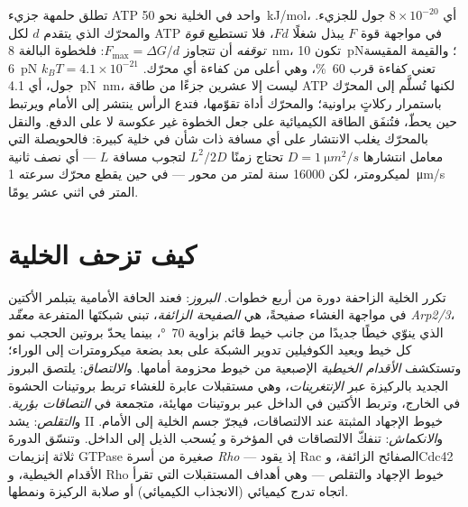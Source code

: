 \begin{proposition}\label{prop:b3:cytoskeleton-motility:physics}
تطلق حلمهة جزيء ATP واحد في الخلية نحو \qty{50}{kJ/mol}،
أي $8\times 10^{-20}$ جول للجزيء. والمحرّك الذي يتقدم $d$
لكل ATP في مواجهة قوة $F$ يبذل شغلًا $Fd$، فلا تستطيع \emph{قوة توقفه}
أن تتجاوز $F_{\max} = \Delta G/d$: فلخطوة  البالغة \qty{8}{nm}،
تكون \qty{10}{pN}؛ والقيمة المقيسة \qty{6}{pN} تعني كفاءة قرب
\qty{60}{\%}، وهي أعلى من كفاءة أي محرّك.  $k_{B}T =
4.1\times 10^{-21}$ جول، أي \qty{4.1}{pN.nm}، ليست إلا عشرين جزءًا من
طاقة ATP لكنها تُسلَّم إلى المحرّك باستمرار ركلاتٍ
براونية؛ والمحرّك أداة تقوّمها، فتدع الرأس
ينتشر إلى الأمام ويرتبط حين يحطّ، فتُنفَق الطاقة الكيميائية
على جعل الخطوة غير عكوسة لا على الدفع.
والنقل بالمحرّك يغلب الانتشار على أي مسافة ذات شأن في
خلية كبيرة: فالحويصلة التي معامل انتشارها $D = \qty{1}{\micro
m^2/s}$ تحتاج زمنًا $L^{2}/2D$ لتجوب مسافة $L$ --- أي نصف
ثانية لميكرومتر، لكن \num{16000} سنة لمتر من محور ---
في حين يقطع محرّك سرعته \qty{1}{\micro m/s} المتر في اثني عشر يومًا.
\end{proposition}
\admitted

\section{كيف تزحف الخلية}

\begin{definition}\label{def:b3:cytoskeleton-motility:migration}
تكرر الخلية الزاحفة دورة من أربع خطوات. \emph{البروز}: فعند
الحافة الأمامية يتبلمر الأكتين في مواجهة الغشاء صفيحةً، هي
\emph{الصفيحة الزائفة}، تبني شبكتَها المتفرعة
\emph{معقّد Arp2/3}، الذي ينوّي خيطًا جديدًا من جانب
خيط قائم بزاوية \qty{70}{\degree}، بينما يحدّ بروتين الحجب نمو كل
خيط ويعيد الكوفيلين تدوير الشبكة على بعد بضعة ميكرومترات
إلى الوراء؛ وتستكشف \emph{الأقدام الخيطية} الإصبعية من خيوط محزومة أمامها.
و\emph{الالتصاق}: يلتصق البروز الجديد بالركيزة عبر
\emph{الإنتغرينات}، وهي مستقبلات عابرة للغشاء تربط بروتينات الحشوة
في الخارج، وتربط الأكتين في الداخل عبر بروتينات مهايئة، متجمعة في
\emph{التصاقات بؤرية}. و\emph{التقلص}: يشد  II
خيوط الإجهاد المثبتة عند الالتصاقات، فيجرّ جسم الخلية
إلى الأمام. و\emph{الانكماش}: تنفكّ الالتصاقات في المؤخرة و
يُسحب الذيل إلى الداخل. وتنسّق الدورةَ ثلاثة إنزيمات GTPase صغيرة من
أسرة \emph{Rho} --- إذ يقود Rac الصفائح الزائفة، وCdc42 الأقدام الخيطية، و
Rho خيوط الإجهاد والتقلص --- وهي أهداف
المستقبلات التي تقرأ اتجاه تدرج كيميائي
(الانجذاب الكيميائي) أو صلابة الركيزة ونمطها.
\end{definition}

